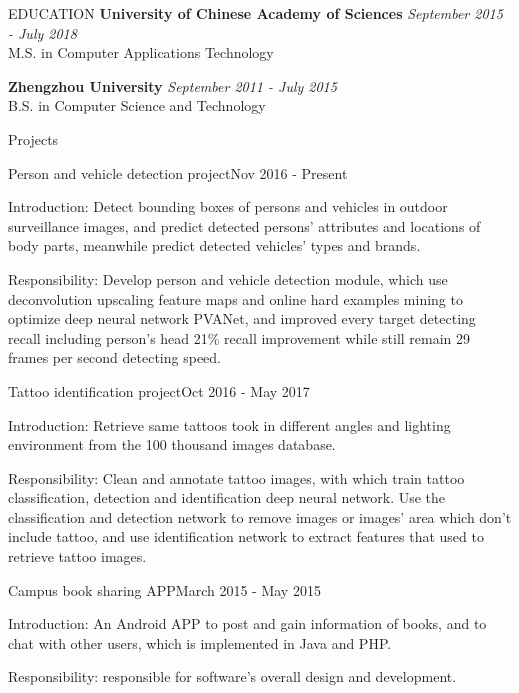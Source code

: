 \documentclass{resume} %
\begin{document}
\begin{rSection}{EDUCATION}
{\bf University of Chinese Academy of Sciences} \hfill {\em September 2015 - July 2018} \\
M.S. in Computer Applications Technology
\vspace{0.3em}

{\bf Zhengzhou University} \hfill {\em September 2011 - July 2015} \\
B.S. in Computer Science and Technology
\vspace{0.5em}
\end{rSection}



\begin{rSection}{Projects}

\begin{rSubsection}{Person and vehicle detection project}{Nov 2016 - Present}{}{}
\item Introduction: Detect bounding boxes of persons and vehicles in outdoor surveillance images, and predict detected persons' attributes and locations of body parts, meanwhile predict detected vehicles' types and brands. 
\item Responsibility: Develop person and vehicle detection module, which use deconvolution upscaling feature maps and online hard examples mining to optimize deep neural network PVANet, and improved every target detecting recall including person's head 21\% recall improvement while still remain 29 frames per second detecting speed.
\end{rSubsection}


\begin{rSubsection}{Tattoo identification project}{Oct 2016 - May 2017}{}{}
\item Introduction: Retrieve same tattoos took in different angles and lighting environment from the 100 thousand images database.
\item Responsibility: Clean and annotate tattoo images, with which train tattoo classification, detection and identification deep neural network.
Use the classification and detection network to remove images or images' area which don't include tattoo, and use identification network to extract features that used to retrieve tattoo images.
\end{rSubsection}

\begin{rSubsection}{Campus book sharing APP}{March 2015 - May 2015}{}{}
\item Introduction: An Android APP to post and gain information of books, and to chat with other users, which is implemented in Java and PHP.
\item Responsibility: responsible for software's overall design and development.
\end{rSubsection}


\end{rSection}
\end{document}
